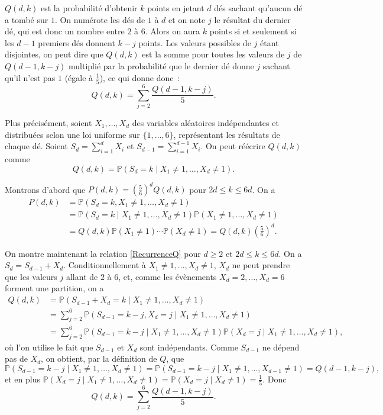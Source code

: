 \documentclass[a4paper,11pt]{amsart}
\theoremstyle{plain}
\begin{document}
$Q(d,k)$ est la probabilité d'obtenir $k$ points en jetant $d$ dés sachant qu'aucun dé a tombé sur $1$. On numérote les dés de $1$ à $d$ et on note $j$ le résultat du dernier dé, qui est donc un nombre entre $2$ à $6$. Alors on aura $k$ points si et seulement si les $d-1$ premiers dés donnent $k-j$ points. Les valeurs possibles de $j$ étant disjointes, on peut dire que $Q(d, k)$ est la somme pour toutes les valeurs de $j$ de $Q(d-1, k-j)$ multiplié par la probabilité que le dernier dé donne $j$ sachant qu'il n'est pas $1$ (égale à $\frac{1}{5}$), ce qui donne donc~:
\begin{equation}
\label{RecurrenceQ}
Q(d, k) = \sum_{j=2}^6 \frac{Q(d-1, k-j)}{5}.
\end{equation}

Plus précisément, soient $X_1, \dotsc, X_d$ des variables aléatoires indépendantes et distribuées selon une loi uniforme sur $\{1, \dotsc, 6\}$, représentant les résultats de chaque dé. Soient $S_d = \sum_{i=1}^d X_i$ et $S_{d-1} = \sum_{i=1}^{d-1} X_i$. On peut réécrire $Q(d, k)$ comme
\[
Q(d, k) = \mathbb P(S_d = k \mid X_1 \neq 1, \dotsc, X_d \neq 1).
\]

Montrons d'abord que $P(d, k) = \left(\frac{5}{6}\right)^d Q(d, k)$ pour $2d \leq k \leq 6d$. On a
\begin{align*}
P(d, k) & = \mathbb P(S_d = k, X_1 \neq 1, \dotsc, X_d \neq 1) \\
& = \mathbb P(S_d = k \mid X_1 \neq 1, \dotsc, X_d \neq 1) \mathbb P(X_1 \neq 1, \dotsc, X_d \neq 1) \\
& = Q(d, k) \mathbb P(X_1 \neq 1) \dotsm \mathbb P(X_d \neq 1) = Q(d, k) \left(\tfrac{5}{6}\right)^d.
\end{align*}

On montre maintenant la relation \eqref{RecurrenceQ} pour $d \geq 2$ et $2d \leq k \leq 6d$. On a $S_d = S_{d-1} + X_d$. Conditionnellement à $X_1 \neq 1, \dotsc, X_d \neq 1$, $X_d$ ne peut prendre que les valeurs $j$ allant de $2$ à $6$, et, comme les évènements $X_d = 2, \dotsc, X_d = 6$ forment une partition, on a
\begin{align*}
Q(d, k) & = \mathbb P(S_{d-1} + X_d = k \mid X_1 \neq 1, \dotsc, X_d \neq 1) \\
& = \sum_{j=2}^6 \mathbb P(S_{d-1} = k-j, X_d = j \mid X_1 \neq 1, \dotsc, X_d \neq 1) \\
& = \sum_{j=2}^6 \mathbb P(S_{d-1} = k-j \mid X_1 \neq 1, \dotsc, X_d \neq 1)\mathbb P(X_d = j \mid X_1 \neq 1, \dotsc, X_d \neq 1),
\end{align*}
où l'on utilise le fait que $S_{d-1}$ et $X_d$ sont indépendants. Comme $S_{d-1}$ ne dépend pas de $X_d$, on obtient, par la définition de $Q$, que
\[\mathbb P(S_{d-1} = k-j \mid X_1 \neq 1, \dotsc, X_d \neq 1) = \mathbb P(S_{d-1} = k-j \mid X_1 \neq 1, \dotsc, X_{d-1} \neq 1) = Q(d-1, k-j),\]
et en plus $\mathbb P(X_d = j \mid X_1 \neq 1, \dotsc, X_d \neq 1) = \mathbb P(X_d = j \mid X_d \neq 1) = \frac{1}{5}$. Donc
\begin{equation*}
Q(d, k) = \sum_{j=2}^6 \frac{Q(d-1, k-j)}{5}.
\end{equation*}
\end{document}
